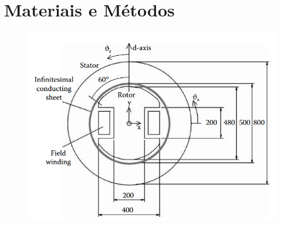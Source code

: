 \section{Materiais e Métodos}
\begin{figure}[H]
\centering
\includegraphics[scale=0.7]{img/assig4/ideal_synchronous_machine.png}
\caption[]{}
\label{}
\end{figure}
